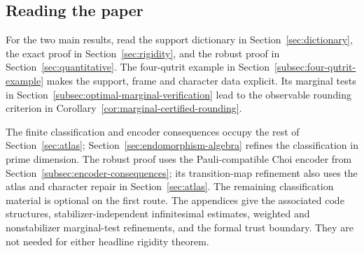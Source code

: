\subsection*{Reading the paper}

For the two main results, read the support dictionary in
Section~\ref{sec:dictionary}, the exact proof in
Section~\ref{sec:rigidity}, and the robust proof in
Section~\ref{sec:quantitative}.  The four-qutrit example in
Section~\ref{subsec:four-qutrit-example} makes the support, frame and
character data explicit.  Its marginal tests in
Section~\ref{subsec:optimal-marginal-verification} lead to the observable
rounding criterion in Corollary~\ref{cor:marginal-certified-rounding}.

The finite classification and encoder consequences occupy the rest of
Section~\ref{sec:atlas}; Section~\ref{sec:endomorphism-algebra} refines
the classification in prime dimension.  The robust proof uses the Pauli-compatible Choi encoder from
Section~\ref{subsec:encoder-consequences}; its transition-map refinement
also uses the atlas and character repair in Section~\ref{sec:atlas}.
The remaining classification material is optional on the first route.  The appendices give the associated code structures,
stabilizer-independent infinitesimal estimates, weighted and nonstabilizer
marginal-test refinements, and the formal trust boundary.  They are not
needed for either headline rigidity theorem.
